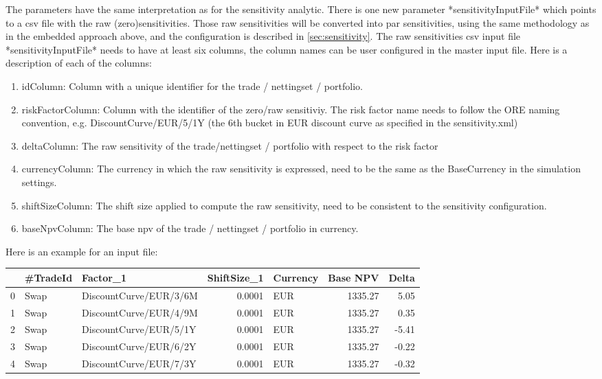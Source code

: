 The parameters have the same interpretation as for the sensitivity analytic. There is one new parameter *sensitivityInputFile* which points to a csv file with the raw (zero)sensitivities. Those raw sensitivities will be converted into par sensitivities, using the same methodology as in the embedded approach above, and the configuration is described in \ref{sec:sensitivity}.
The raw sensitivities csv input file *sensitivityInputFile* needs to have at least six columns, the column names can be user configured in the master input file. Here is a description of each of the columns:
\begin{enumerate}
\item idColumn: Column with a unique identifier for the trade / nettingset / portfolio.
\item riskFactorColumn: Column with the identifier of the zero/raw sensitiviy. The risk factor name needs to follow the ORE naming convention, e.g. DiscountCurve/EUR/5/1Y (the 6th bucket in EUR discount curve as specified in the sensitivity.xml)\
\item deltaColumn: The raw sensitivity of the trade/nettingset / portfolio with respect to the risk factor
\item currencyColumn: The currency in which the raw sensitivity is expressed, need to be the same as the BaseCurrency in the simulation settings.
\item shiftSizeColumn: The shift size applied to compute the raw sensitivity, need to be consistent to the sensitivity configuration.
\item baseNpvColumn: The base npv of the trade / nettingset / portfolio in currency.
\end{enumerate}
Here is an example for an input file:
\begin{table}[hbt]
\scriptsize
\begin{center}
\begin{tabular}{lllrlrr}
\hline
{} & \#TradeId &                Factor\_1 &  ShiftSize\_1 & Currency &  Base NPV &  Delta \\
\hline
0 &     Swap &  DiscountCurve/EUR/3/6M &       0.0001 &      EUR &   1335.27 &   5.05 \\
1 &     Swap &  DiscountCurve/EUR/4/9M &       0.0001 &      EUR &   1335.27 &   0.35 \\
2 &     Swap &  DiscountCurve/EUR/5/1Y &       0.0001 &      EUR &   1335.27 &  -5.41 \\
3 &     Swap &  DiscountCurve/EUR/6/2Y &       0.0001 &      EUR &   1335.27 &  -0.22 \\
4 &     Swap &  DiscountCurve/EUR/7/3Y &       0.0001 &      EUR &   1335.27 &  -0.32 \\
\hline
\end{tabular}
\end{center}
\end{table}

